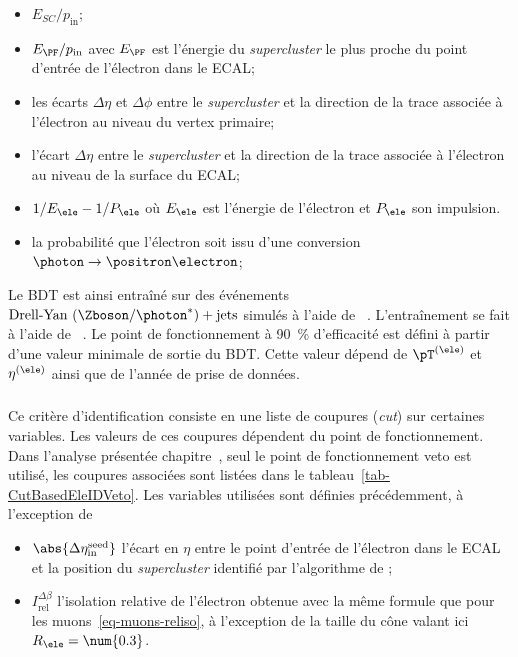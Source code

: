 \begin{itemize}
\item $E_{SC}/p_\text{in}$;
\item $E_{\PF}/p_\text{in}$ avec $E_{\PF}$ est l'énergie du \emph{supercluster} le plus proche du point d'entrée de l'électron dans le ECAL;
\item les écarts $\Delta\eta$ et $\Delta\phi$ entre le \emph{supercluster} et la direction de la trace associée à l'électron au niveau du vertex primaire;
\item l'écart $\Delta\eta$ entre le \emph{supercluster} et la direction de la trace associée à l'électron au niveau de la surface du ECAL;
\item $1/E_{\ele}-1/P_{\ele}$ où $E_{\ele}$ est l'énergie de l'électron et $P_{\ele}$ son impulsion.

\item la probabilité que l'électron soit issu d'une conversion $\photon\to\positron\electron$;
\end{itemize}
\par
Le BDT est ainsi entraîné sur des événements $\text{Drell-Yan ($\Zboson/\photon^*$)} + \text{jets}$ simulés à l'aide de \MADGRAPH~\cite{madgraph5}.
L'entraînement se fait à l'aide de \XGBOOST~\cite{xgboost}.
Le point de fonctionnement à \SI{90}{\%} d'efficacité est défini à partir d'une valeur minimale de sortie du BDT.
Cette valeur dépend de $\pT^{(\ele)}$ et $\eta^{(\ele)}$ ainsi que de l'année de prise de données.
\subparagraph{\CutBasedEleID}
Ce critère d'identification consiste en une liste de coupures (\emph{cut}) sur certaines variables.
Les valeurs de ces coupures dépendent du point de fonctionnement.
Dans l'analyse présentée chapitre~, seul le point de fonctionnement \og veto \fg{} est utilisé, les coupures associées sont listées dans le tableau~\ref{tab-CutBasedEleIDVeto}.
Les variables utilisées sont définies précédemment, à l'exception de
\begin{itemize}
\item $\abs{\Delta\eta_\text{in}^\text{seed}}$ l'écart en $\eta$ entre le point d'entrée de l'électron dans le ECAL et la position du \emph{supercluster} identifié par l'algorithme de \PF;
\item $I_\text{rel}^{\Delta\beta}$ l'isolation relative de l'électron obtenue avec la même formule que pour les muons~\eqref{eq-muons-reliso}, à l'exception de la taille du cône valant ici $R_{\ele}=\num{0.3}$.
\end{itemize}
